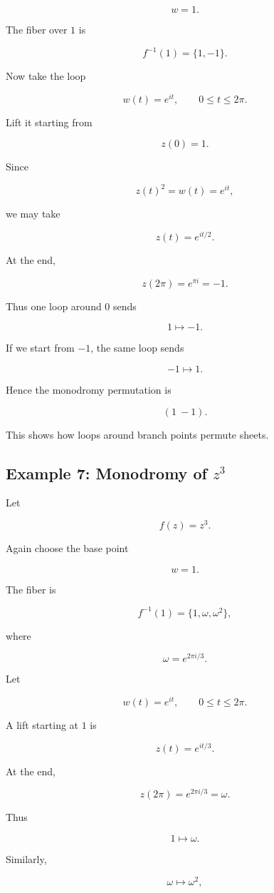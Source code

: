 \documentclass[12pt,a4paper]{article}
\theoremstyle{notespace}
\begin{document}
\[
w=1.
\]

The fiber over \(1\) is

\[
f^{-1}(1)=\{1,-1\}.
\]

Now take the loop

\[
w(t)=e^{it},
\qquad
0\le t\le 2\pi.
\]

Lift it starting from

\[
z(0)=1.
\]

Since

\[
z(t)^2=w(t)=e^{it},
\]

we may take

\[
z(t)=e^{it/2}.
\]

At the end,

\[
z(2\pi)=e^{\pi i}=-1.
\]

Thus one loop around \(0\) sends

\[
1\mapsto -1.
\]

If we start from \(-1\), the same loop sends

\[
-1\mapsto 1.
\]

Hence the monodromy permutation is

\[
(1\ -1).
\]

This shows how loops around branch points permute sheets.

\subsection{Example 7: Monodromy of \(z^3\)}

Let

\[
f(z)=z^3.
\]

Again choose the base point

\[
w=1.
\]

The fiber is

\[
f^{-1}(1)=\{1,\omega,\omega^2\},
\]

where

\[
\omega=e^{2\pi i/3}.
\]

Let

\[
w(t)=e^{it},
\qquad
0\le t\le2\pi.
\]

A lift starting at \(1\) is

\[
z(t)=e^{it/3}.
\]

At the end,

\[
z(2\pi)=e^{2\pi i/3}=\omega.
\]

Thus

\[
1\mapsto\omega.
\]

Similarly,

\[
\omega\mapsto\omega^2,
\]
\end{document}
